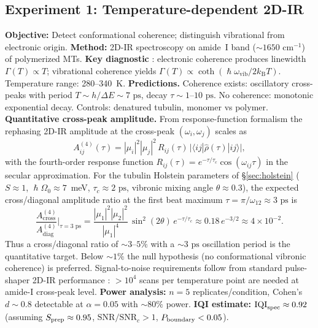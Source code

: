 \documentclass[twocolumn,10pt]{article}
\renewcommand{\hbar}{\hslash}
\newcommand{\kB}{k_{\text{B}}}
\newcommand{\ps}{\text{~ps}}
\begin{document}
\subsection{Experiment 1: Temperature-dependent 2D-IR}
\label{sec:exp1}
\textbf{Objective:} Detect conformational coherence; distinguish
vibrational from electronic origin.
\textbf{Method:} 2D-IR spectroscopy on amide~I band ($\sim 1650\text{~cm}^{-1}$)
of polymerized MTs.
\textbf{Key diagnostic} \cite{Christensson2012,Dean2017}: electronic
coherence produces linewidth $\Gamma(T) \propto T$; vibrational coherence
yields $\Gamma(T) \propto \coth(\hbar\omega_{\text{vib}}/2\kB T)$.
Temperature range: 280--340~K.
\textbf{Predictions.} Coherence exists: oscillatory cross-peaks with period
$T \sim h/\Delta E \sim 7\ps$, decay $\tau \sim 1\text{--}10\ps$. No
coherence: monotonic exponential decay. Controls: denatured tubulin,
monomer vs polymer.
\textbf{Quantitative cross-peak amplitude.} From response-function
formalism \cite{Mukamel1995} the rephasing 2D-IR amplitude at the
cross-peak $(\omega_i,\omega_j)$ scales as
\begin{equation}
A_{ij}^{(4)}(\tau)=|\mu_i|^2|\mu_j|^2\,
R_{ij}(\tau)\,\bigl|\langle ij|\hat\rho(\tau)|ij\rangle\bigr|,
\end{equation}
with the fourth-order response function
$R_{ij}(\tau)=e^{-\tau/\tau_c}\cos(\omega_{ij}\tau)$ in the secular
approximation. For the tubulin Holstein parameters of
\S\ref{sec:holstein} ($S\approx 1$, $\hbar\Omega_0\approx 7$~meV,
$\tau_c\approx 2\ps$, vibronic mixing angle $\theta\approx 0.3$), the
expected cross/diagonal amplitude ratio at the first beat maximum
$\tau=\pi/\omega_{12}\approx 3\ps$ is
\begin{equation}
\frac{A^{(4)}_{\text{cross}}}{A^{(4)}_{\text{diag}}}\Bigg|_{\tau=3\ps}
=\frac{|\mu_1|^2|\mu_2|^2}{|\mu_1|^4}\,\sin^2(2\theta)\,e^{-\tau/\tau_c}
\approx 0.18\,e^{-3/2}\approx 4\times 10^{-2}.
\end{equation}
Thus a cross/diagonal ratio of $\sim 3\text{--}5\%$ with a $\sim 3\ps$
oscillation period is the quantitative target. Below $\sim 1\%$ the null
hypothesis (no conformational vibronic coherence) is preferred.
Signal-to-noise requirements follow from standard pulse-shaper 2D-IR
performance \cite{Hamm2011}: $>10^4$ scans per temperature point are
needed at amide-I cross-peak level.
\textbf{Power analysis:} $n=5$ replicates/condition, Cohen's $d \sim 0.8$
detectable at $\alpha = 0.05$ with $\sim 80\%$ power.
\textbf{IQI estimate:} $\text{IQI}_{\rm spec} \approx 0.92$ (assuming $S_{\rm prep}\approx 0.95$, $\text{SNR}/\text{SNR}_c > 1$, $P_{\rm boundary} < 0.05$).
\end{document}
